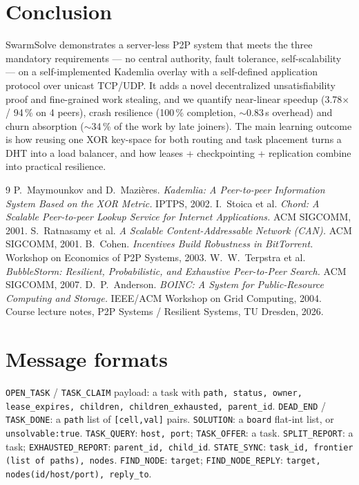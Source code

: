 \documentclass[11pt,a4paper]{article}
\newcommand{\code}[1]{\texttt{#1}}
\begin{document}
\section{Conclusion}\label{sec:conc}

SwarmSolve demonstrates a server-less P2P system that meets the three mandatory requirements ---
no central authority, fault tolerance, self-scalability --- on a self-implemented Kademlia overlay
with a self-defined application protocol over unicast TCP/UDP. It adds a novel decentralized
unsatisfiability proof and fine-grained work stealing, and we quantify near-linear speedup
(3.78$\times$ / 94\,\% on 4 peers), crash resilience (100\,\% completion, $\sim$0.83\,s overhead)
and churn absorption ($\sim$34\,\% of the work by late joiners). The main learning outcome is how
reusing one XOR key-space for both routing and task placement turns a DHT into a load balancer,
and how leases + checkpointing + replication combine into practical resilience.

\begin{thebibliography}{9}
   P.~Maymounkov and D.~Mazi\`eres. \emph{Kademlia: A Peer-to-peer Information
    System Based on the XOR Metric.} IPTPS, 2002.
   I.~Stoica et al. \emph{Chord: A Scalable Peer-to-peer Lookup Service for
    Internet Applications.} ACM SIGCOMM, 2001.
   S.~Ratnasamy et al. \emph{A Scalable Content-Addressable Network (CAN).} ACM
    SIGCOMM, 2001.
   B.~Cohen. \emph{Incentives Build Robustness in BitTorrent.} Workshop on
    Economics of P2P Systems, 2003.
   W.~W.~Terpstra et al. \emph{BubbleStorm: Resilient, Probabilistic, and
    Exhaustive Peer-to-Peer Search.} ACM SIGCOMM, 2007.
   D.~P.~Anderson. \emph{BOINC: A System for Public-Resource Computing and
    Storage.} IEEE/ACM Workshop on Grid Computing, 2004.
   Course lecture notes, P2P Systems / Resilient Systems, TU Dresden, 2026.
\end{thebibliography}

\appendix
\section{Message formats}\label{app:msg}
\code{OPEN\_TASK} / \code{TASK\_CLAIM} payload: a task with \code{path, status, owner,
lease\_expires, children, children\_exhausted, parent\_id}. \code{DEAD\_END} / \code{TASK\_DONE}:
a \code{path} list of \code{[cell,val]} pairs. \code{SOLUTION}: a \code{board} flat-int list, or
\code{unsolvable:true}. \code{TASK\_QUERY}: \code{host, port}; \code{TASK\_OFFER}: a task.
\code{SPLIT\_REPORT}: a task; \code{EXHAUSTED\_REPORT}: \code{parent\_id, child\_id}.
\code{STATE\_SYNC}: \code{task\_id, frontier (list of paths), nodes}. \code{FIND\_NODE}:
\code{target}; \code{FIND\_NODE\_REPLY}: \code{target, nodes(id/host/port), reply\_to}.
\end{document}
